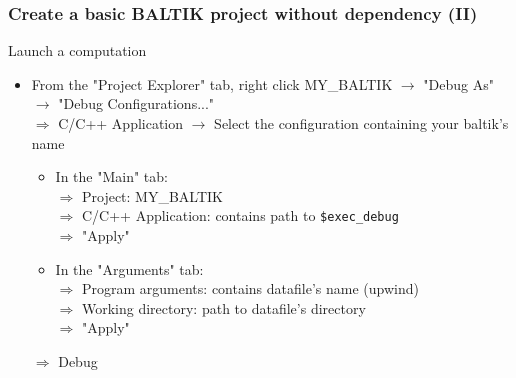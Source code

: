 \documentclass[10pt, hyperref={unicode=true,pdfusetitle, bookmarks=true,bookmarksnumbered=false,bookmarksopen=false, breaklinks=false,pdfborder={0 0 1},backref=true,colorlinks=true,linkcolor=darkblue,pageanchor, urlcolor=darkblue}]{beamer}
\begin{document}
\begin{frame}
\frametitle{Create a basic BALTIK project without dependency (II)}

\begin{exampleblock}{Launch a computation}
\begin{itemize}
\item From the "Project Explorer" tab, right click MY\_BALTIK $\rightarrow$ "Debug As" $\rightarrow$ "Debug Configurations..." \\
  $\Rightarrow$ C/C++ Application $\rightarrow$ Select the configuration containing your baltik's name
  \begin{itemize}
  \item In the "Main" tab:\\
  $\Rightarrow$ Project: MY\_BALTIK \\
  $\Rightarrow$ C/C++ Application: contains path to \texttt{\$exec\_debug} \\
  $\Rightarrow$ "Apply" 
  \item In the "Arguments" tab:\\
  $\Rightarrow$ Program arguments: contains datafile's name (upwind) \\
  $\Rightarrow$ Working directory: path to datafile's directory \\
  $\Rightarrow$ "Apply"
  \end{itemize}
  $\Rightarrow$ Debug

\end{itemize}
\end{exampleblock}

\end{frame}
\end{document}

